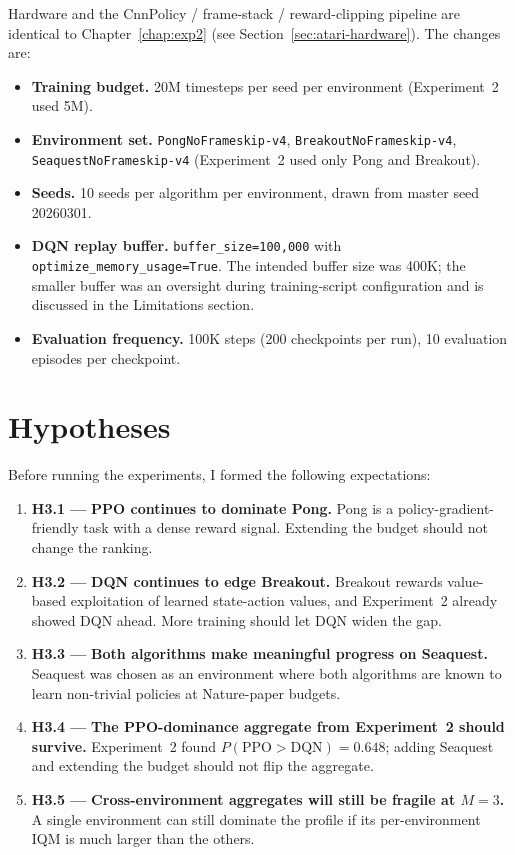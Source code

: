 Hardware and the CnnPolicy / frame-stack / reward-clipping pipeline are identical to Chapter~\ref{chap:exp2} (see Section~\ref{sec:atari-hardware}). The changes are:

\begin{itemize}
  \item \textbf{Training budget.} 20M timesteps per seed per environment (Experiment~2 used 5M).
  \item \textbf{Environment set.} \texttt{PongNoFrameskip-v4}, \texttt{BreakoutNoFrameskip-v4}, \texttt{SeaquestNoFrameskip-v4} (Experiment~2 used only Pong and Breakout).
  \item \textbf{Seeds.} 10 seeds per algorithm per environment, drawn from master seed 20260301.
  \item \textbf{DQN replay buffer.} \texttt{buffer\_size=100{,}000} with \texttt{optimize\_memory\_usage=True}. The intended buffer size was 400K; the smaller buffer was an oversight during training-script configuration and is discussed in the Limitations section.
  \item \textbf{Evaluation frequency.} 100K steps (200 checkpoints per run), 10 evaluation episodes per checkpoint.
\end{itemize}

\section{Hypotheses}
\label{sec:exp3-hypotheses}

Before running the experiments, I formed the following expectations:

\begin{enumerate}
  \item {\color{red} \textbf{H3.1 ---}} \textbf{PPO continues to dominate Pong.} Pong is a policy-gradient-friendly task with a dense reward signal. Extending the budget should not change the ranking.
  \item {\color{red} \textbf{H3.2 ---}} \textbf{DQN continues to edge Breakout.} Breakout rewards value-based exploitation of learned state-action values, and Experiment~2 already showed DQN ahead. More training should let DQN widen the gap.
  \item {\color{red} \textbf{H3.3 ---}} \textbf{Both algorithms make meaningful progress on Seaquest.} Seaquest was chosen as an environment where both algorithms are known to learn non-trivial policies at Nature-paper budgets.
  \item {\color{red} \textbf{H3.4 ---}} \textbf{The PPO-dominance aggregate from Experiment~2 should survive.} Experiment~2 found $P(\text{PPO}>\text{DQN})=0.648$; adding Seaquest and extending the budget should not flip the aggregate.
  \item {\color{red} \textbf{H3.5 ---}} \textbf{Cross-environment aggregates will still be fragile at $M=3$.} A single environment can still dominate the profile if its per-environment IQM is much larger than the others.
\end{enumerate}


